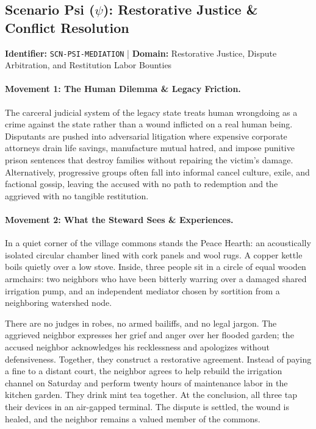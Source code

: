 \subsection{Scenario Psi (\texorpdfstring{$\psi$}{Psi}): Restorative Justice \& Conflict Resolution}
\label{subsec:scn_psi}
\textbf{Identifier:} \texttt{SCN-PSI-MEDIATION} \quad | \quad \textbf{Domain:} Restorative Justice, Dispute Arbitration, and Restitution Labor Bounties

\paragraph{Movement 1: The Human Dilemma \& Legacy Friction.}
The carceral judicial system of the legacy state treats human wrongdoing as a crime against the state rather than a wound inflicted on a real human being. Disputants are pushed into adversarial litigation where expensive corporate attorneys drain life savings, manufacture mutual hatred, and impose punitive prison sentences that destroy families without repairing the victim's damage. Alternatively, progressive groups often fall into informal cancel culture, exile, and factional gossip, leaving the accused with no path to redemption and the aggrieved with no tangible restitution.

\paragraph{Movement 2: What the Steward Sees \& Experiences.}
In a quiet corner of the village commons stands the Peace Hearth: an acoustically isolated circular chamber lined with cork panels and wool rugs. A copper kettle boils quietly over a low stove. Inside, three people sit in a circle of equal wooden armchairs: two neighbors who have been bitterly warring over a damaged shared irrigation pump, and an independent mediator chosen by sortition from a neighboring watershed node. 

There are no judges in robes, no armed bailiffs, and no legal jargon. The aggrieved neighbor expresses her grief and anger over her flooded garden; the accused neighbor acknowledges his recklessness and apologizes without defensiveness. Together, they construct a restorative agreement. Instead of paying a fine to a distant court, the neighbor agrees to help rebuild the irrigation channel on Saturday and perform twenty hours of maintenance labor in the kitchen garden. They drink mint tea together. At the conclusion, all three tap their devices in an air-gapped terminal. The dispute is settled, the wound is healed, and the neighbor remains a valued member of the commons.

